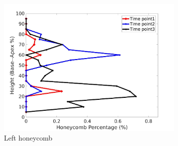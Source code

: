 \begin{figure}[H]
\begin{subfigure}{.42\linewidth}
  \includegraphics[width=\linewidth,trim={{.0\wd0} {.0\wd0} {.0\wd0} {.0\wd0}},clip]{Appendix/Image_AppexA/BaseToApex/IPF15LeftLungHoneycombDiseaseAgainstHeight.jpg} %
  \caption{Left honeycomb}
  \label{fig:IPF15DiseaseAgainstHeight-e} 
\end{subfigure} 
\begin{subfigure}{.42\linewidth}%

\end{subfigure}
\end{figure}
